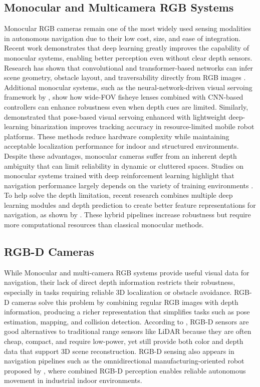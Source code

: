 \subsection{Monocular and Multicamera RGB Systems}
Monocular RGB cameras remain one of the most widely used sensing modalities in autonomous navigation due to their low cost, size, and ease of integration. Recent work demonstrates that deep learning greatly improves the capability of monocular systems, enabling better perception even without clear depth sensors. Research has shown that convolutional and transformer-based networks can infer scene geometry, obstacle layout, and traversability directly from RGB images 
\citep{Sleaman2022MonocularDNNNavigation}. Additional monocular systems, such as the neural-network-driven visual servoing framework by \cite{Jokic2019NNVisualServoing}, show how wide-FOV fisheye lenses combined with CNN-based controllers can enhance robustness even when depth cues are limited. Similarly, \cite{Ho2020PoseVisualServoing} demonstrated that pose-based visual servoing enhanced with lightweight deep-learning binarization improves tracking accuracy in resource-limited mobile robot platforms. These methods reduce hardware complexity while maintaining acceptable localization performance for indoor and structured environments.
Despite these advantages, monocular cameras suffer from an inherent depth ambiguity that can limit reliability in dynamic or cluttered spaces. Studies on monocular systems trained with deep reinforcement learning highlight that navigation performance largely depends on the variety of training environments \citep{Yokoyama2020DRLMonocularNavigation}. To help solve the depth limitation, recent research combines multiple deep learning modules and depth prediction to create better feature representations for navigation, as shown by \cite{Machkour2022MonocularNavigationMultipleDL}. These hybrid pipelines increase robustness but require more computational resources than classical monocular methods.

\subsection{RGB-D Cameras}
While Monocular and multi-camera RGB systems provide useful visual data for navigation, their lack of direct depth information restricts their robustness, especially in tasks requiring reliable 3D localization or obstacle avoidance. RGB-D cameras solve this problem by combining regular RGB images with depth information, producing a richer representation that simplifies tasks such as pose estimation, mapping, and collision detection. According to \cite{Civera2017RGBDOdometrySLAM}, RGB-D sensors are good alternatives to traditional range sensors like LiDAR because they are often cheap, compact, and require low-power, yet still provide both color and depth data that support 3D scene reconstruction. RGB-D sensing also appears in navigation pipelines such as the omnidirectional manufacturing-oriented robot proposed by \cite{Patruno2020VisionBasedOmniIndoor}, where combined RGB-D perception enables reliable autonomous movement in industrial indoor environments.

